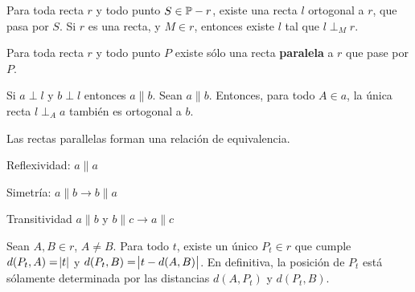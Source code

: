 \importante{} Para toda recta $r$ y todo punto $S \in \P - r$, existe una recta $l$ ortogonal a $r$, que pasa por $S$. Si $r$ es una recta, y $M \in r$, entonces existe $l$ tal que $l \perp_M r$.

 Para toda recta $r$ y todo punto $P$ existe sólo una recta \textbf{paralela} a $r$ que pase por $P$.

 Si $a \perp l$ y $b \perp l$ entonces $a \parallel b$. Sean $a \parallel b$. Entonces, para todo $A \in a$, la única recta $l \perp_A a$ también es ortogonal a $b$.

 Las rectas parallelas forman una relación de equivalencia.
\begin{itemizex}
	\item Reflexividad: $a\parallel a$
	\item Simetría: $a \parallel b \rightarrow b \parallel a$
	\item Transitividad  $a \parallel b $ y  $b \parallel c \rightarrow a \parallel c$
\end{itemizex}

 Sean $A,B \in r$, $A \neq B$. Para todo $t$, existe un único $P_t\in r$ que cumple $d(P_t,A) = \abs{t}$ y $d(P_t, B) = \abs{t-d(A,B)}$. En definitiva, la posición de $P_t$ está sólamente determinada por las distancias $d(A, P_t)$ y $d(P_t, B)$.
	 
	 
	 
	 
	 
	 
	 